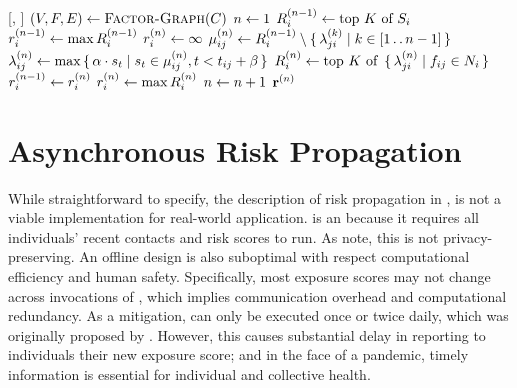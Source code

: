 \begin{function}[H]{\nRiskPropagation}[\vScores, \vContacts]
  \State $(\vVariables, \vFactors, \vEdges) \assign \Call{Factor-Graph}{\vContacts}$
  \State $n \leftarrow 1$
  \ForEach{$\vVariable[i] \in \vVariables$}
    \State $\vIndexedExpScores{i}{n - 1} \assign \topK{\vScores_i}$
    \State $\vIndexedMaxExpScores[i]{n - 1} \assign \max \vIndexedExpScores{i}{n - 1}$
    \State $\vIndexedMaxExpScores[i]{n} \assign \infty$
  \EndFor
    \ForEach{$\{\vVariable[i], \vFactor[ij]\} \in \vEdges$}
      \State $\vVariableMsg{i}{j}{n} \assign \vIndexedExpScores{i}{n - 1} \setminus \setBuilder{\vFactorMsg{j}{i}{k}}{k \in [1 \ltwodots n - 1]}$
    \EndFor
    \ForEach{$\{\vVariable[i], \vFactor[ij]\} \in \vEdges$}
      \State $\lambda_{ij}^{(n)} \leftarrow \max \set{ \alpha\cdot s_t | s_t \in \mu_{ij}^{(n)}, t < t_{ij} + \beta}$
    \EndFor
    \ForEach{$\vVariable[i] \in \vVariables$}
      \State $\vIndexedExpScores{i}{n} \assign \topK{\setBuilder{\vFactorMsg{j}{i}{n}}{\vFactor[ij] \in \vNeighbors_i}}$
    \EndFor
    \ForEach{$\vVariable[i] \in \vVariables$}
      \State $\vIndexedMaxExpScores[i]{n - 1} \assign \vIndexedMaxExpScores[i]{n}$
      \State $\vIndexedMaxExpScores[i]{n} \assign \max \vIndexedExpScores{i}{n}$
    \EndFor
    \State $n \leftarrow n + 1$
  \EndWhile
  \State \Return $\vIndexedMaxExpScores{n}$
\end{function}

\section{Asynchronous Risk Propagation}\label{sec:asynchronous}

While straightforward to specify, the description of risk propagation in , is not a viable implementation for real-world application. \cRiskPropagation{} is an  because it requires all individuals' recent contacts and risk scores to run. As \citet{Ayday2021} note, this is not privacy-preserving. An offline design is also suboptimal with respect computational efficiency and human safety. Specifically, most exposure scores may not change across invocations of \cRiskPropagation{}, which implies communication overhead and computational redundancy. As a mitigation, \cRiskPropagation{} can only be executed once or twice daily, which was originally proposed by \citet{Ayday2020}. However, this causes substantial delay in reporting to individuals their new exposure score; and in the face of a pandemic, timely information is essential for individual and collective health.

